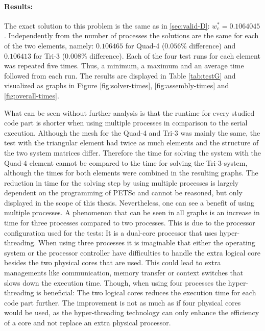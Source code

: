   \paragraph{Results:} The exact solution to this problem is the same as in \ref{sec:valid-D}: $w_c^* = 0.1064045$. Independently from the number of processes the solutions are the same for each of the two elements, namely: $0.106465$ for Quad-4 ($0.056\%$ difference) and $0.106413$ for Tri-3 ($0.008\%$ difference). Each of the four test runs for each element was repeated five times. Thus, a minimum, a maximum and an average time followed from each run. The results are displayed in Table \ref{tab:testG} and visualized as graphs in Figure \ref{fig:solver-times}, \ref{fig:assembly-times} and \ref{fig:overall-times}.
  
  What can be seen without further analysis is that the runtime for every studied code part is shorter when using multiple processes in comparison to the serial execution. Although the mesh for the Quad-4 and Tri-3 was mainly the same, the test with the triangular element had twice as much elements and the structure of the two system matrices differ. Therefore the time for solving the system with the Quad-4 element cannot be compared to the time for solving the Tri-3-system, although the times for both elements were combined in the resulting graphs. The reduction in time for the solving step by using multiple processes is largely dependent on the programming of PETSc and cannot be reasoned, but only displayed in the scope of this thesis. Nevertheless, one can see a benefit of using multiple processes. A phenomenon that can be seen in all graphs is an increase in time for three processes compared to two processes. This is due to the processor configuration used for the tests: It is a dual-core processor that uses hyper-threading. When using three processes it is imaginable that either the operating system or the processor controller have difficulties to handle the extra logical core besides the two physical cores that are used. This could lead to extra managements like communication, memory transfer or context switches that slows down the execution time. Though, when using four processes the hyper-threading is beneficial: The two logical cores reduces the execution time for each code part further. The improvement is not as much as if four physical cores would be used, as the hyper-threading technology can only enhance the efficiency of a core and not replace an extra physical processor.
  
